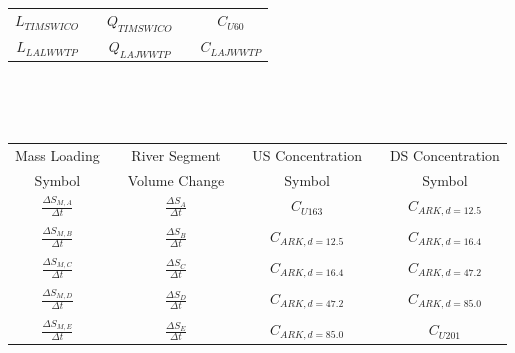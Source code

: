 \begin{linenumbers}
\begin{table}[htbp]
\begin{subtable}{\textwidth}
\begin{tabular}{c c c c c}
			$ L_{TIMSWICO} $ & & $ Q_{TIMSWICO} $ & & $ C_{U60} $\\
			$ L_{LALWWTP} $ & & $ Q_{LAJWWTP} $ & & $ C_{LAJWWTP} $\\
			\bottomrule
		\end{tabular} \\
	\end{subtable}\\
	\tablevspace
	\begin{subtable}{\textwidth}
		\centering
		\begin{tabular}{c c c c c c c} 
			\toprule  
			Mass Loading & & River Segment & & US Concentration & & DS Concentration\\
			Symbol & & Volume Change & & Symbol & & Symbol\\
			\toprule 
			$ \displaystyle \frac{\Delta S_{M,A}}{\Delta t} $ & & $ \displaystyle \frac{\Delta S_A}{\Delta t} $ & & $ C_{U163} $ & & $ C_{ARK,d=12.5} $\\ \\
			$ \displaystyle \frac{\Delta S_{M,B}}{\Delta t} $ & & $ \displaystyle \frac{\Delta S_B}{\Delta t} $ & & $ C_{ARK,d=12.5} $ & & $ C_{ARK,d=16.4} $\\ \\
			$ \displaystyle \frac{\Delta S_{M,C}}{\Delta t} $ & & $ \displaystyle \frac{\Delta S_C}{\Delta t} $ & & $ C_{ARK,d=16.4} $ & & $ C_{ARK,d=47.2} $\\ \\
			$ \displaystyle \frac{\Delta S_{M,D}}{\Delta t} $ & & $ \displaystyle \frac{\Delta S_D}{\Delta t} $ & & $ C_{ARK,d=47.2} $ & & $ C_{ARK,d=85.0} $\\ \\
			$ \displaystyle \frac{\Delta S_{M,E}}{\Delta t} $ & & $ \displaystyle \frac{\Delta S_E}{\Delta t} $ & & $ C_{ARK,d=85.0} $ & & $ C_{U201} $\\
			\bottomrule
		\end{tabular} \\
	\end{subtable}\\
\end{table}


\end{linenumbers}
